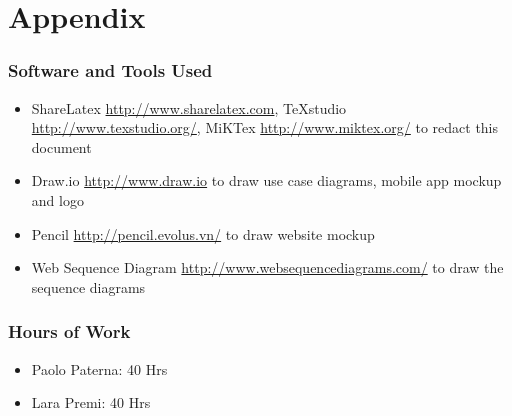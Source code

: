 \section{Appendix}
\subsubsection{Software and Tools Used}
	\begin{itemize}
		\item ShareLatex \url{http://www.sharelatex.com}, TeXstudio \url{http://www.texstudio.org/}, MiKTex \url{http://www.miktex.org/} to redact this document
		\item Draw.io \url{http://www.draw.io} to draw use case diagrams, mobile app mockup and logo
		\item Pencil \url{http://pencil.evolus.vn/} to draw website mockup
		\item Web Sequence Diagram \url{http://www.websequencediagrams.com/} to draw the sequence diagrams
	\end{itemize}
\subsubsection{Hours of Work}
\begin{itemize}
	\item Paolo Paterna: 40 Hrs
	\item Lara Premi: 40 Hrs
\end{itemize}